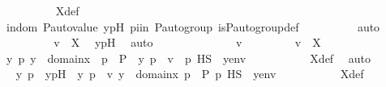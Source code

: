 \begin{isabellebody}
\ \ \ \ \ \ \ \ \isamarkupfalse%
\ X{\isacharunderscore}{\kern0pt}def\ \isanewline
\ \ \ \ \ \ \ \ \isamarkupfalse%
\ indom\ P{\isacharunderscore}{\kern0pt}auto{\isacharunderscore}{\kern0pt}value\ ypH\ piin{\isasymG}\ {\isasymG}{\isacharunderscore}{\kern0pt}P{\isacharunderscore}{\kern0pt}auto{\isacharunderscore}{\kern0pt}group\ is{\isacharunderscore}{\kern0pt}P{\isacharunderscore}{\kern0pt}auto{\isacharunderscore}{\kern0pt}group{\isacharunderscore}{\kern0pt}def\isanewline
\ \ \ \ \ \ \ \ \isamarkupfalse%
\ auto\isanewline
\ \ \ \ \ \ \isamarkupfalse%
\ \isamarkupfalse%
\ {\isachardoublequoteopen}v\ {\isasymin}\ X{\isachardoublequoteclose}\ \isamarkupfalse%
\ ypH\ \isamarkupfalse%
\ auto\isanewline
\ \ \ \ \isamarkupfalse%
\ \isanewline
\ \ \ \ \ \ \isamarkupfalse%
\ v\ \isanewline
\ \ \ \ \ \ \isamarkupfalse%
\ {\isachardoublequoteopen}v\ {\isasymin}\ X{\isachardoublequoteclose}\ \isanewline
\ \ \ \ \ \ \isamarkupfalse%
\ \isamarkupfalse%
\ {\isachardoublequoteopen}{\isasymexists}y\ p{\isachardot}{\kern0pt}\ y\ {\isasymin}\ domain{\isacharparenleft}{\kern0pt}x{\isacharparenright}{\kern0pt}\ {\isasymand}\ p\ {\isasymin}\ P\ {\isasymand}\ {\isacharless}{\kern0pt}y{\isacharcomma}{\kern0pt}\ p{\isachargreater}{\kern0pt}\ {\isacharequal}{\kern0pt}\ v\ {\isasymand}\ p\ {\isasymtturnstile}HS\ {\isasymphi}\ {\isacharbrackleft}{\kern0pt}y{\isacharbrackright}{\kern0pt}{\isacharat}{\kern0pt}env{\isachardoublequoteclose}\ \isanewline
\ \ \ \ \ \ \ \ \isamarkupfalse%
\ X{\isacharunderscore}{\kern0pt}def\ \isamarkupfalse%
\ auto\isanewline
\ \ \ \ \ \ \isamarkupfalse%
\ \isamarkupfalse%
\ y\ p\ \ ypH\ {\isacharcolon}{\kern0pt}\ {\isachardoublequoteopen}{\isacharless}{\kern0pt}y{\isacharcomma}{\kern0pt}\ p{\isachargreater}{\kern0pt}\ {\isacharequal}{\kern0pt}\ v{\isachardoublequoteclose}\ {\isachardoublequoteopen}y\ {\isasymin}\ domain{\isacharparenleft}{\kern0pt}x{\isacharparenright}{\kern0pt}{\isachardoublequoteclose}\ {\isachardoublequoteopen}p\ {\isasymin}\ P{\isachardoublequoteclose}\ {\isachardoublequoteopen}p\ {\isasymtturnstile}HS\ {\isasymphi}\ {\isacharbrackleft}{\kern0pt}y{\isacharbrackright}{\kern0pt}{\isacharat}{\kern0pt}env{\isachardoublequoteclose}\ \isanewline
\ \ \ \ \ \ \ \ \isamarkupfalse%
\ X{\isacharunderscore}{\kern0pt}def\ \isamarkupfalse%

\end{isabellebody}
